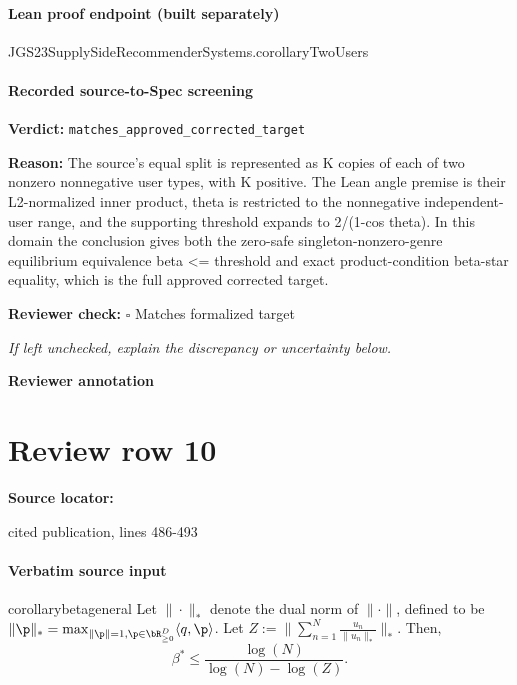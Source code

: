 \documentclass[10pt]{article}
\newcommand{\reviewerbox}{%
  \par\noindent\fbox{\parbox{0.96\linewidth}{\rule{0pt}{0.38in}}}\par
}
\newcommand{\reviewmatch}[1]{%
  \par\noindent\textbf{Reviewer check:} $\square$\; #1\par
  \noindent\emph{If left unchecked, explain the discrepancy or uncertainty below.}\par
}
\begin{document}
\paragraph{Lean proof endpoint (built separately)}\begin{ReviewVerbatim}
JGS23SupplySideRecommenderSystems.corollaryTwoUsers
\end{ReviewVerbatim}

\paragraph{Recorded source-to-Spec screening}
\textbf{Verdict:} \texttt{matches\_approved\_corrected\_target}
\\
{\raggedright
\textbf{Reason:} The source's equal split is represented as K copies of each of two nonzero nonnegative user types, with K positive.\allowbreak{} The Lean angle premise is their L2-\allowbreak{}normalized inner product, theta is restricted to the nonnegative independent-\allowbreak{}user range, and the supporting threshold expands to 2/\allowbreak{}(1-\allowbreak{}cos theta).\allowbreak{} In this domain the conclusion gives both the zero-\allowbreak{}safe singleton-\allowbreak{}nonzero-\allowbreak{}genre equilibrium equivalence beta <= threshold and exact product-\allowbreak{}condition beta-\allowbreak{}star equality, which is the full approved corrected target.\allowbreak{}
\par}
\reviewmatch{Matches formalized target}
\noindent\textbf{Reviewer annotation}\par
\reviewerbox
\clearpage
\hypertarget{source-claim-4388a6e0e9c7deaf}{}
\section*{Review row 10}
\textbf{Source locator:} {\footnotesize\raggedright cited publication, lines 486-\allowbreak{}493\par}
\paragraph{Verbatim source input}
\begin{ReviewVerbatim}
\begin{restatable}{corollary}{betageneral}
\label{cor:beta}
Let $\|\cdot\|_{*}$ denote the dual norm of $\|\cdot\|$, defined to be $\|\p\|_{*} = \max_{\|\p\| = 1, \p \in \bR_{\ge 0}^D} \langle q, \p \rangle$. Let $Z:= \|\sum_{n=1}^{N} \frac{u_n}{\|u_n\|_{*}} \|_{*}$. Then,
\begin{equation}
\label{eq:betacondition}
\beta^* \le \frac{\log (N)}{\log(N) - \log(Z)}.
\end{equation}
\end{restatable}
\end{ReviewVerbatim}
\end{document}
